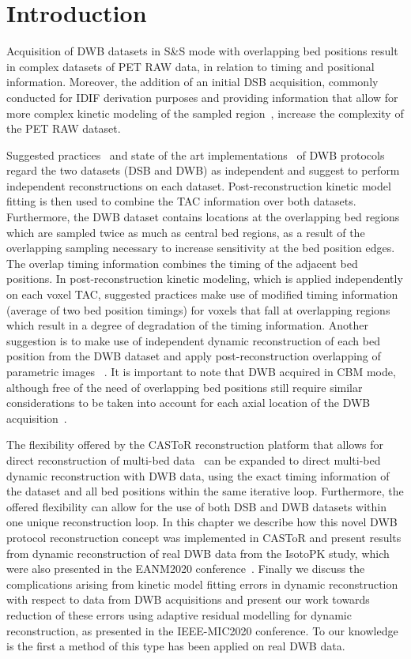 \section{Introduction}
Acquisition of DWB datasets in S\&S mode with overlapping bed positions result in complex datasets of PET RAW data, in relation to timing and positional information. Moreover, the addition of an initial DSB acquisition, commonly conducted for IDIF derivation purposes and providing information that allow for more complex kinetic modeling of the sampled region~\cite{Zaker2020}, increase the complexity of the PET RAW dataset. 

Suggested practices~\cite{Karakatsanis2013} and state of the art implementations~\cite{Hu2020} of DWB protocols regard the two datasets (DSB and DWB) as independent and suggest to perform independent reconstructions on each dataset. Post-reconstruction kinetic model fitting is then used to combine the TAC information over both datasets. 
Furthermore, the DWB dataset contains locations at the overlapping bed regions which are sampled twice as much as central bed regions, as a result of the overlapping sampling necessary to increase sensitivity at the bed position edges. The overlap timing information combines the timing of the adjacent bed positions. In post-reconstruction kinetic modeling, which is applied independently on each voxel TAC, suggested practices make use of modified timing information (average of two bed position timings) for voxels that fall at overlapping regions~\cite{Karakatsanis2013} which result in a degree of degradation of the timing information. Another suggestion is to make use of independent dynamic reconstruction of each bed position from the DWB dataset and apply post-reconstruction overlapping of parametric images ~\cite{Karakatsanis2016a}.
It is important to note that DWB acquired in CBM mode, although free of the need of overlapping bed positions still require similar considerations to be taken into account for each axial location of the DWB acquisition~\cite{Karakatsanis2016b,Hu2020}.

The flexibility offered by the CASToR reconstruction platform that allows for direct reconstruction of multi-bed data~\cite{Ross2004} can be expanded to direct multi-bed dynamic reconstruction with DWB data, using the exact timing information of the dataset and all bed positions within the same iterative loop. Furthermore, the offered flexibility can allow for the use of both DSB and DWB datasets within one unique reconstruction loop.
In this chapter we describe how this novel DWB protocol reconstruction concept was implemented in CASToR and present results from dynamic reconstruction of real DWB data from the IsotoPK study, which were also presented in the EANM2020 conference~\cite{chalampalakis2020EANM}.
Finally we discuss the complications arising from kinetic model fitting errors in dynamic reconstruction with respect to data from DWB acquisitions and present our work towards reduction of these errors using adaptive residual modelling for dynamic reconstruction, as presented in the IEEE-MIC2020 conference. To our knowledge is the first a method of this type has been applied on real DWB data.

